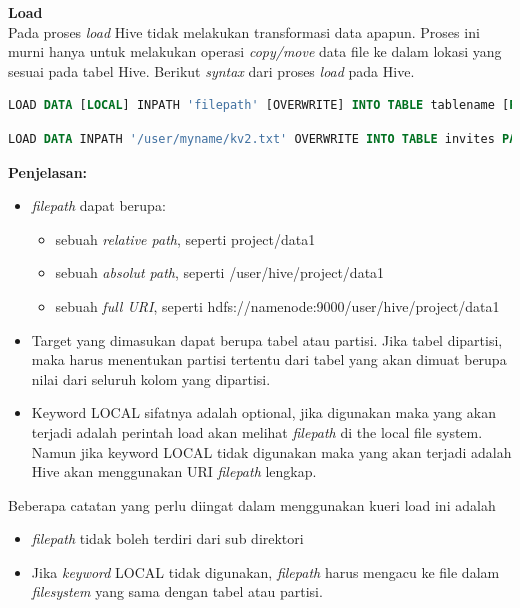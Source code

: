 \textbf{Load}\\
Pada proses \textit{load} Hive tidak melakukan transformasi data apapun. Proses ini murni hanya untuk melakukan operasi \textit{copy/move} data file ke dalam lokasi yang sesuai pada tabel Hive. Berikut \textit{syntax} dari proses \textit{load} pada Hive.

\begin{lstlisting}[language=sql,basicstyle=\tiny,caption=Syntax DML Load]
LOAD DATA [LOCAL] INPATH 'filepath' [OVERWRITE] INTO TABLE tablename [PARTITION (partcol1=val1, partcol2=val2 ...)]
\end{lstlisting}

\begin{lstlisting}[language=sql,basicstyle=\tiny,caption=Contoh DML Load]
LOAD DATA INPATH '/user/myname/kv2.txt' OVERWRITE INTO TABLE invites PARTITION (ds='2008-08-15');
\end{lstlisting}

\textbf{Penjelasan: }
\begin{itemize}
	\item \textit{filepath} dapat berupa:
		\begin{itemize}
			\item sebuah \textit{relative path}, seperti project/data1
			\item sebuah \textit{absolut path}, seperti /user/hive/project/data1
			\item sebuah \textit{full URI}, seperti hdfs://namenode:9000/user/hive/project/data1
		\end{itemize}
	\item Target yang dimasukan dapat berupa tabel atau partisi. Jika tabel dipartisi, maka harus menentukan partisi tertentu dari tabel yang akan dimuat berupa nilai dari seluruh kolom yang dipartisi.
	\item Keyword LOCAL sifatnya adalah optional, jika digunakan maka yang akan terjadi adalah perintah load akan melihat \textit{filepath} di the local file system. Namun jika keyword LOCAL tidak digunakan maka yang akan terjadi adalah Hive akan menggunakan URI \textit{filepath} lengkap.
\end{itemize}

Beberapa catatan yang perlu diingat dalam menggunakan kueri load ini adalah
\begin{itemize}
	\item \textit{filepath} tidak boleh terdiri dari sub direktori
	\item Jika \textit{keyword} LOCAL tidak digunakan, \textit{filepath} harus mengacu ke file dalam \textit{filesystem} yang sama dengan tabel atau partisi.
\end{itemize}

